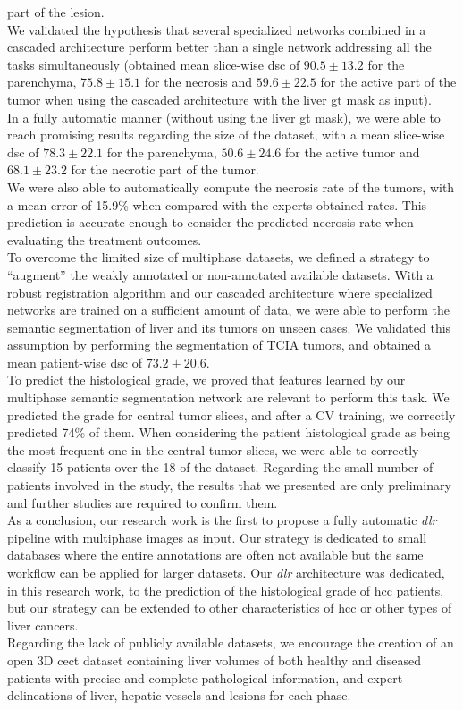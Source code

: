 part of the lesion. \\
We validated the hypothesis that several specialized networks combined
in a cascaded architecture perform better than a single network
addressing all the tasks simultaneously (obtained mean slice-wise \ac{dsc} of
$ 90.5 \pm 13.2 $ for the parenchyma, $ 75.8 \pm 15.1 $ for the necrosis and $ 59.6 \pm
22.5 $ for the active part of the tumor when using the cascaded
architecture with the liver \ac{gt} mask as input).\\
In a fully automatic manner (without using the liver \ac{gt} mask), we were
able to reach promising results regarding the size of the dataset, with
a mean slice-wise \ac{dsc} of $ 78.3 \pm 22.1 $ for the parenchyma, $ 50.6 \pm 24.6 $ for
the active tumor and $ 68.1 \pm 23.2 $ for the necrotic part of the tumor.\\
We were also able to automatically compute the necrosis rate of the
tumors, with a mean error of 15.9\% when compared with the experts
obtained rates. This prediction is accurate enough to consider the
predicted necrosis rate when evaluating the treatment outcomes. \\
To overcome the limited size of multiphase datasets, we defined a
strategy to ``augment'' the weakly annotated or non-annotated available
datasets.
With a robust registration algorithm and our cascaded architecture where
specialized networks are trained on a sufficient amount of data, we were
able to perform the semantic segmentation of liver and its tumors on
unseen cases.
We validated this assumption by performing the segmentation of TCIA
tumors, and obtained a mean patient-wise \ac{dsc} of $ 73.2 \pm 20.6 $.\\
To predict the histological grade, we proved that features learned by
our multiphase semantic segmentation network are relevant to perform
this task.
We predicted the grade for central tumor slices, and after a CV
training, we correctly predicted 74\% of them. When considering the
patient histological grade as being the most frequent one in the central
tumor slices, we were able to correctly classify 15 patients over the 18
of the dataset. Regarding the small number of patients involved in the study,
the results that we presented are only preliminary and further studies are required to confirm them.\\
As a conclusion, our research work is the first to propose a fully
automatic \emph{\ac{dlr}} pipeline with multiphase images as input. Our
strategy is dedicated to small databases where the entire annotations
are often not available but the same workflow can be applied for larger
datasets. Our \emph{\ac{dlr}} architecture was dedicated, in this research
work, to the prediction of the histological grade of \ac{hcc} patients, but
our strategy can be extended to other characteristics of \ac{hcc} or other
types of liver cancers.\\
Regarding the lack of publicly available datasets, we encourage the
creation of an open 3D \ac{cect} dataset containing liver volumes of both
healthy and diseased patients with precise and complete pathological
information, and expert delineations of liver, hepatic vessels and
lesions for each phase.


